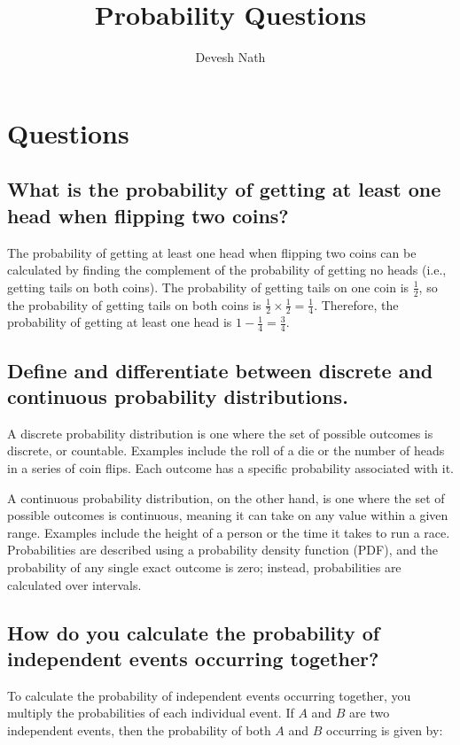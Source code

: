 \documentclass[12pt]{article}
\title{Probability Questions}
\author{Devesh Nath}
\date{}
\begin{document}
\maketitle

\section{Questions}
\subsection{What is the probability of getting at least one head when flipping two coins?}
The probability of getting at least one head when flipping two coins can be calculated by finding the complement of the probability of getting no heads (i.e., getting tails on both coins). The probability of getting tails on one coin is $\frac{1}{2}$, so the probability of getting tails on both coins is $\frac{1}{2} \times \frac{1}{2} = \frac{1}{4}$. Therefore, the probability of getting at least one head is $1 - \frac{1}{4} = \frac{3}{4}$.

\subsection{Define and differentiate between discrete and continuous probability distributions.}
A discrete probability distribution is one where the set of possible outcomes is discrete, or countable. Examples include the roll of a die or the number of heads in a series of coin flips. Each outcome has a specific probability associated with it.

A continuous probability distribution, on the other hand, is one where the set of possible outcomes is continuous, meaning it can take on any value within a given range. Examples include the height of a person or the time it takes to run a race. Probabilities are described using a probability density function (PDF), and the probability of any single exact outcome is zero; instead, probabilities are calculated over intervals.

\subsection{How do you calculate the probability of independent events occurring together?}
To calculate the probability of independent events occurring together, you multiply the probabilities of each individual event. If \(A\) and \(B\) are two independent events, then the probability of both \(A\) and \(B\) occurring is given by:
\end{document}

